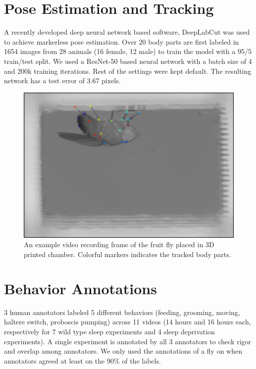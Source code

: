 \section{Pose Estimation and Tracking}
A recently developed deep neural network based software, DeepLabCut was used to achieve markerless pose estimation.
Over 20 body parts are first labeled in 1654 images from 28 animals (16 female, 12 male) to train the model with a 95/5 train/test split.
We used a ResNet-50 based neural network with a batch size of 4 and 200k training iterations.
Rest of the settings were kept default.
The resulting network has a test error of 3.67 pixels.

\begin{figure}[ht!]
	\centering
	\includegraphics[width=0.75\linewidth]{figures/FlyTrackedBodyParts.png}
	\caption[An example frame of the fruit fly placed in 3D printed chamber.] {An example video recording frame of the fruit fly placed in 3D printed chamber. Colorful markers indicates the tracked body parts.}
\end{figure}

\section{Behavior Annotations}

3 human annotators labeled 5 different behaviors (feeding, grooming, moving, haltere switch, proboscis pumping) across 11 videos (14 hours and 16 hours each, respectively for 7 wild type sleep experiments and 4 sleep deprivation experiments).
A single experiment is annotated by all 3 annotators to check rigor and overlap among annotators. We only used the annotations of a fly on when  annotators agreed at least on the 90\% of the labels.

